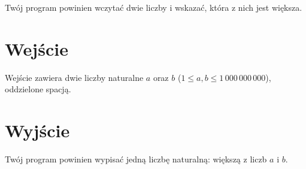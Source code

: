 \documentclass{spiral-kurs}
\begin{document}
\makeheader
%
    Twój program powinien wczytać dwie liczby i wskazać, która z nich jest większa.

    \section{Wejście}
    Wejście zawiera dwie liczby naturalne $a$ oraz $b$
    ($1 \le a, b \le 1\,000\,000\,000$), oddzielone spacją.

    \section{Wyjście}
    Twój program powinien wypisać jedną liczbę naturalną: większą z liczb $a$ i $b$.



  
\end{document}
